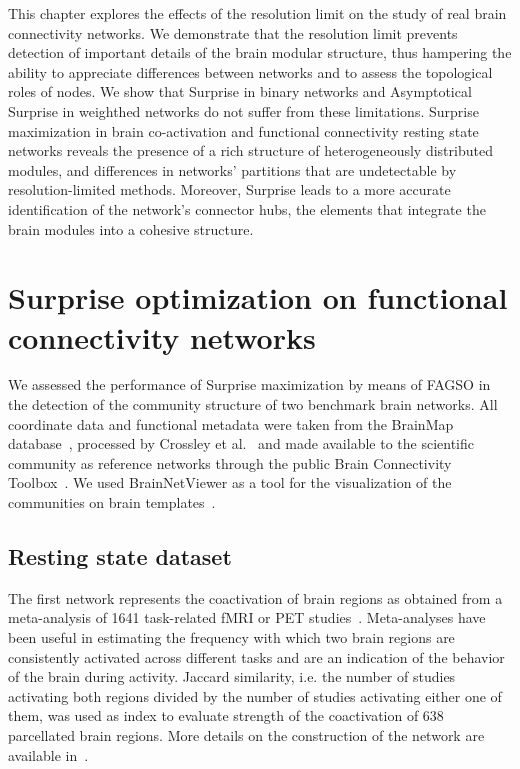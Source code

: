 This chapter explores the effects of the resolution limit on the study of real brain connectivity networks.
We demonstrate that the resolution limit prevents detection of important details of the brain modular structure, thus hampering the ability to appreciate differences between networks and to assess the topological roles of nodes.
We show that Surprise in binary networks and Asymptotical Surprise in weighthed networks do not suffer from these limitations.
Surprise maximization in brain co-activation and functional connectivity resting state networks reveals the presence of a rich structure of heterogeneously distributed modules, and differences in networks' partitions that are undetectable by resolution-limited methods. Moreover, Surprise leads to a more accurate identification of the network's connector hubs, the elements that integrate the brain modules into a cohesive structure.


\section{Surprise optimization on functional connectivity networks}\label{sec:surprise_optimization_fc_networks}
We assessed the performance of Surprise maximization by means of FAGSO in the detection of the community structure of two benchmark brain networks. All coordinate data and functional metadata were taken from the BrainMap database~\cite{fox2002,laird2005}, processed by Crossley et al.~\cite{crossley2013a} and made available to the scientific community as reference networks through the public Brain Connectivity Toolbox~\cite{rubinov2010}. We used BrainNetViewer as a tool for the visualization of the communities on brain templates~\cite{xia2013}.

\subsection{Resting state dataset}
The first network represents the coactivation of brain regions as obtained from a meta-analysis of 1641 task-related fMRI or PET studies~\cite{crossley2013a}.
Meta-analyses have been useful in estimating the frequency with which two brain regions are consistently activated across different tasks and are an indication of the behavior of the brain during activity.
Jaccard similarity, i.e. the number of studies activating both regions divided by the number of studies activating either one of them, was used as index to evaluate strength of the coactivation of 638 parcellated brain regions. More details on the construction of the network are available in~\cite{crossley2013a}.

